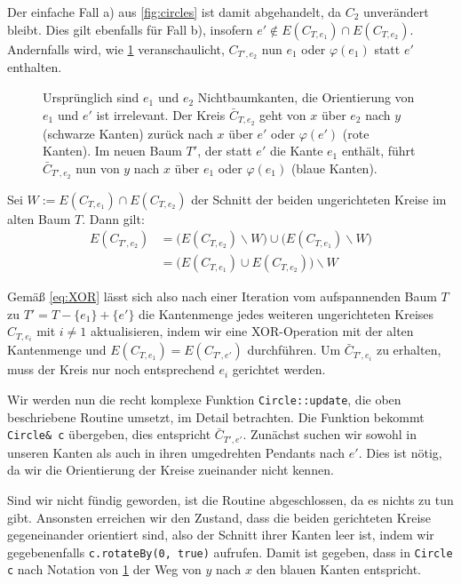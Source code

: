 Der einfache Fall a) aus \cref{fig:circles} ist damit abgehandelt, da $C_2$ unverändert bleibt. Dies gilt ebenfalls für Fall b), insofern $e'\notin E(C_{T,e_1})\cap E(C_{T,e_2})$. Andernfalls wird, wie \cref{fig:bypass} veranschaulicht, $C_{T',e_2}$ nun $e_1$ oder $\varphi(e_1)$ statt $e'$ enthalten.

\begin{figure}[!ht]\centering
    
    \caption{Ursprünglich sind $e_1$ und $e_2$ Nichtbaumkanten, die Orientierung von $e_1$ und $e'$ ist irrelevant. Der Kreis $\bar{C}_{T,e_2}$ geht von $x$ über $e_2$ nach $y$ (schwarze Kanten) zurück nach $x$ über $e'$ oder $\varphi(e')$ (rote Kanten). Im neuen Baum $T'$, der statt $e'$ die Kante $e_1$ enthält, führt $\bar{C}_{T',e_2}$ nun von $y$ nach $x$ über $e_1$ oder $\varphi(e_1)$ (blaue Kanten).}
    \label{fig:bypass}
\end{figure}

Sei $W:=E(C_{T,e_1})\cap E(C_{T,e_2})$ der Schnitt der beiden ungerichteten Kreise im alten Baum $T$. Dann gilt:
\begin{align}E(C_{T',e_2})&=\big(E(C_{T,e_2})\backslash W\big)\cup\big(E(C_{T,e_1})\backslash W\big)\nonumber\\
&=\big(E(C_{T,e_1})\cup E(C_{T,e_2})\big)\backslash W\label{eq:XOR}\end{align}

Gemäß \cref{eq:XOR} lässt sich also nach einer Iteration vom aufspannenden Baum $T$ zu $T'=T-\{e_1\}+\{e'\}$ die Kantenmenge jedes weiteren ungerichteten Kreises $C_{T,e_i}$ mit $i\neq1$  aktualisieren, indem wir eine XOR-Operation mit der alten Kantenmenge und $E(C_{T,e_1})=E(C_{T',e'})$ durchführen. Um $\bar{C}_{T',e_i}$ zu erhalten, muss der Kreis nur noch entsprechend $e_i$ gerichtet werden.

Wir werden nun die recht komplexe Funktion \lstinline|Circle::update|, die oben beschriebene Routine umsetzt, im Detail betrachten. Die Funktion bekommt \lstinline|Circle& c| übergeben, dies entspricht $\bar{C}_{T',e'}$. Zunächst suchen wir sowohl in unseren Kanten als auch in ihren umgedrehten Pendants nach $e'$. Dies ist nötig, da wir die Orientierung der Kreise zueinander nicht kennen.

Sind wir nicht fündig geworden, ist die Routine abgeschlossen, da es nichts zu tun gibt. Ansonsten erreichen wir den Zustand, dass die beiden gerichteten Kreise gegeneinander orientiert sind, also der Schnitt ihrer Kanten leer ist, indem wir gegebenenfalls \lstinline|c.rotateBy(0, true)| aufrufen. Damit ist gegeben, dass in \lstinline|Circle c| nach Notation von \cref{fig:bypass} der Weg von $y$ nach $x$ den blauen Kanten entspricht.

